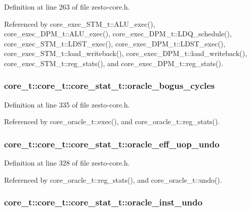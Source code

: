 Definition at line 263 of file zesto-core.h.

Referenced by core\_\-exec\_\-STM\_\-t::ALU\_\-exec(), core\_\-exec\_\-DPM\_\-t::ALU\_\-exec(), core\_\-exec\_\-DPM\_\-t::LDQ\_\-schedule(), core\_\-exec\_\-STM\_\-t::LDST\_\-exec(), core\_\-exec\_\-DPM\_\-t::LDST\_\-exec(), core\_\-exec\_\-STM\_\-t::load\_\-writeback(), core\_\-exec\_\-DPM\_\-t::load\_\-writeback(), core\_\-exec\_\-STM\_\-t::reg\_\-stats(), and core\_\-exec\_\-DPM\_\-t::reg\_\-stats().
\subsubsection[{oracle\_\-bogus\_\-cycles}]{ core\_\-t::core\_\-t::core\_\-stat\_\-t::oracle\_\-bogus\_\-cycles}\label{structcore__t_1_1core__stat__t_7cf3db555f89a1f97af10c481a820d51}




Definition at line 335 of file zesto-core.h.

Referenced by core\_\-oracle\_\-t::exec(), and core\_\-oracle\_\-t::reg\_\-stats().
\subsubsection[{oracle\_\-eff\_\-uop\_\-undo}]{ core\_\-t::core\_\-t::core\_\-stat\_\-t::oracle\_\-eff\_\-uop\_\-undo}\label{structcore__t_1_1core__stat__t_f45e29e7af5cc3d2d4642fde587eb4c7}




Definition at line 328 of file zesto-core.h.

Referenced by core\_\-oracle\_\-t::reg\_\-stats(), and core\_\-oracle\_\-t::undo().
\subsubsection[{oracle\_\-inst\_\-undo}]{ core\_\-t::core\_\-t::core\_\-stat\_\-t::oracle\_\-inst\_\-undo}\label{structcore__t_1_1core__stat__t_4297d18ae42208a6fe8d25fe88ab13c7}




